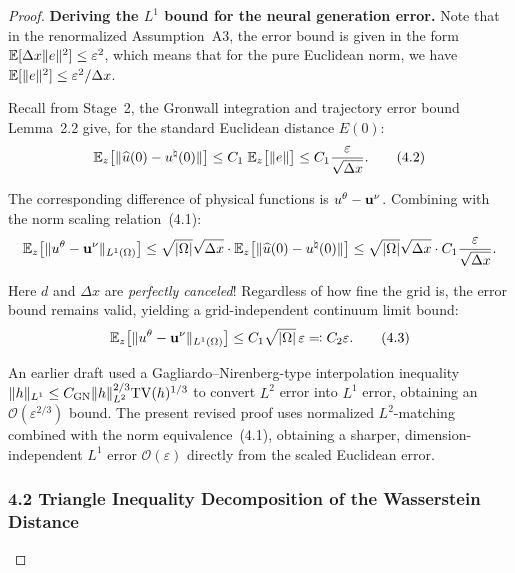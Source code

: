 \begin{proof}
\textbf{Deriving the $L^1$ bound for the neural generation error.}
Note that in the renormalized Assumption~A3, the error bound is given in the form $\mathbb{E}[\Delta x \lVert e \rVert^2] \leq \varepsilon^2$, which means that for the pure Euclidean norm, we have $\mathbb{E}[\lVert e \rVert^2] \leq \varepsilon^2 / \Delta x$.

Recall from Stage~2, the Gronwall integration and trajectory error bound Lemma~2.2 give, for the standard Euclidean distance $E(0)$:
\begin{equation}\label{eq:4.2}
  \mathbb{E}_z\bigl[\lVert \widehat{u}(0) - u^{\natural}(0) \rVert\bigr] \leq C_1 \; \mathbb{E}_z\bigl[\lVert e \rVert\bigr] \leq C_1 \frac{\varepsilon}{\sqrt{\Delta x}}. \tag{4.2}
\end{equation}

The corresponding difference of physical functions is $u^{\theta} - \mathbf{u}^{\nu}$. Combining with the norm scaling relation~(4.1):
\begin{equation}
  \mathbb{E}_z\bigl[\lVert u^{\theta} - \mathbf{u}^{\nu} \rVert_{L^1(\Omega)}\bigr] \leq \sqrt{|\Omega|} \sqrt{\Delta x} \cdot \mathbb{E}_z\bigl[\lVert \widehat{u}(0) - u^{\natural}(0) \rVert\bigr] \leq \sqrt{|\Omega|} \sqrt{\Delta x} \cdot C_1 \frac{\varepsilon}{\sqrt{\Delta x}}.
\end{equation}

Here $d$ and $\Delta x$ are \emph{perfectly canceled}! Regardless of how fine the grid is, the error bound remains valid, yielding a grid-independent continuum limit bound:
\begin{equation}\label{eq:4.3}
  \mathbb{E}_z\bigl[\lVert u^{\theta} - \mathbf{u}^{\nu} \rVert_{L^1(\Omega)}\bigr] \leq C_1 \sqrt{|\Omega|} \, \varepsilon \eqqcolon C_2 \varepsilon. \tag{4.3}
\end{equation}

\begin{remark}
An earlier draft used a Gagliardo--Nirenberg-type interpolation inequality $\lVert h \rVert_{L^1} \leq C_{\mathrm{GN}} \lVert h \rVert_{L^2}^{2/3} \mathrm{TV}(h)^{1/3}$ to convert $L^2$ error into $L^1$ error, obtaining an $\mathcal{O}(\varepsilon^{2/3})$ bound.
The present revised proof uses normalized $L^2$-matching combined with the norm equivalence~(4.1), obtaining a sharper, dimension-independent $L^1$ error $\mathcal{O}(\varepsilon)$ directly from the scaled Euclidean error.
\end{remark}

\subsubsection{4.2 Triangle Inequality Decomposition of the Wasserstein Distance}


\end{proof}

